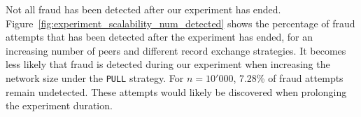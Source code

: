 Not all fraud has been detected after our experiment has ended.
Figure~\ref{fig:experiment_scalability_num_detected} shows the percentage of fraud attempts that has been detected after the experiment has ended, for an increasing number of peers and different record exchange strategies.
It becomes less likely that fraud is detected during our experiment when increasing the network size under the \texttt{PULL} strategy.
For $ n = 10'000 $, 7.28\% of fraud attempts remain undetected.
These attempts would likely be discovered when prolonging the experiment duration.



